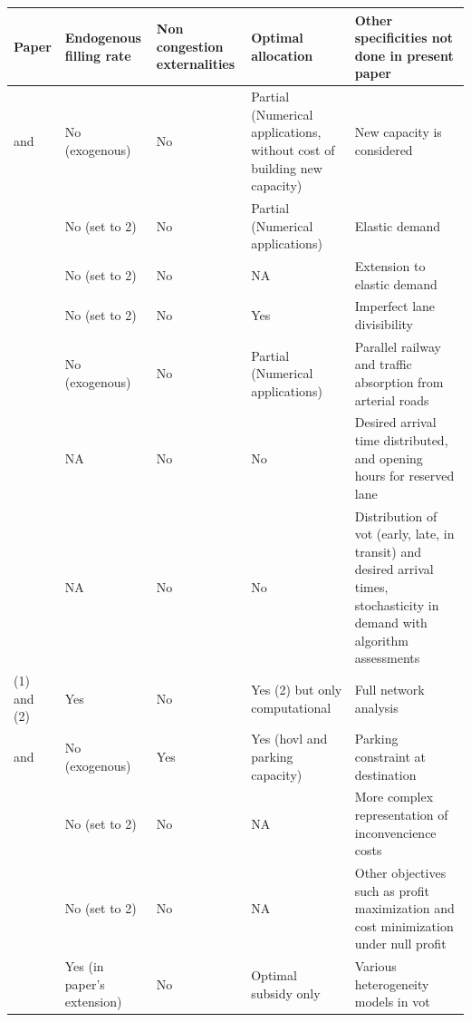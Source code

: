 \documentclass[english, a4paper]{article}
\theoremstyle{plain}
\theoremstyle{definition}
\theoremstyle{remark}
\begin{document}
\begin{table}
    \centering
    \begin{tabular}{|m{}||m{}|m{}|m{}|m{}|}
    \hline
        Paper & Endogenous filling rate & Non congestion externalities & Optimal allocation & Other specificities not done in present paper \\
        \hline\hline
        \cite{dahlgren_high_1998} and \cite{dahlgren_high-occupancytoll_2002} & No (exogenous) & No & Partial (Numerical applications, without cost of building new capacity) & New capacity is considered \\\hline
        \cite{yang_carpooling_1999} & No (set to 2) & No & Partial (Numerical applications) & Elastic demand \\\hline
        \cite{huang_models_2000} & No (set to 2) & No & NA & Extension to elastic demand \\\hline
        \cite{konishi_carpooling_2010} & No (set to 2) & No & Yes & Imperfect lane divisibility \\\hline
        \cite{qian_modeling_2011} & No (exogenous) & No & Partial (Numerical applications) & Parallel railway and traffic absorption from arterial roads\\\hline
        \cite{gonzales_morning_2012} & NA & No & No & Desired arrival time distributed, and opening hours for reserved lane \\\hline
        \cite{boyles_incorporating_2015} & NA & No & No & Distribution of \acrshort{vot} (early, late, in transit) and desired arrival times, stochasticity in demand with algorithm assessments\\\hline
        \cite{xu_complementarity_2015} (1) and \cite{di_link-node_2018} (2) & Yes & No & Yes (2) but only computational & Full network analysis \\\hline
        \cite{xiao_morning_2016} and \cite{xiao_tradable_2021} & No (exogenous) & Yes & Yes (\acrshort{hovl} and parking capacity) & Parking constraint at destination \\\hline
        \cite{liu_pricing_2017} & No (set to 2) & No & NA & More complex representation of inconvencience costs\\\hline
        \cite{wang_dynamic_2019} & No (set to 2) & No & NA & Other objectives such as profit maximization and cost minimization under null profit\\\hline
        \cite{yu_carpooling_2019} & Yes (in paper’s extension) & No & Optimal subsidy only & Various heterogeneity models in \acrshort{vot}\\\hline

\end{tabular}
\end{table}
\end{document}
